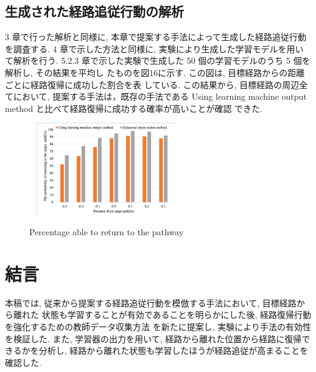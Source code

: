 \documentclass{jarticle}
\begin{document}
\subsection{生成された経路追従行動の解析}
3 章で行った解析と同様に, 本章で提案する手法によって生成した経路追従行動を調査する.
4 章で示した方法と同様に, 実験により生成した学習モデルを用いて解析を行う.
5.2.3 章で示した実験で生成した 50 個の学習モデルのうち 5 個を解析し, その結果を平均し
たものを図16に示す. この図は, 目標経路からの距離ごとに経路復帰に成功した割合を表
している. この結果から, 目標経路の周辺全てにおいて, 提案する手法は，既存の手法である
Using learning machine output method と比べて経路復帰に成功する確率が高いことが確認
できた.

\begin{figure}[h!]\
  \centering
   \includegraphics[height=40mm]{./figs/last.png}
   \caption{Percentage able to return to the pathway}
\end{figure}


\section{結言}
本稿では, 従来から提案する経路追従行動を模倣する手法において, 目標経路から離れた
状態も学習することが有効であることを明らかにした後, 経路復帰行動を強化するための教師データ収集方法
を新たに提案し, 実験により手法の有効性を検証した.
また, 学習器の出力を用いて, 経路から離れた位置から経路に復帰できるかを分析し, 経路から離れた状態も学習したほうが経路追従が高まることを確認した.
\end{document}

